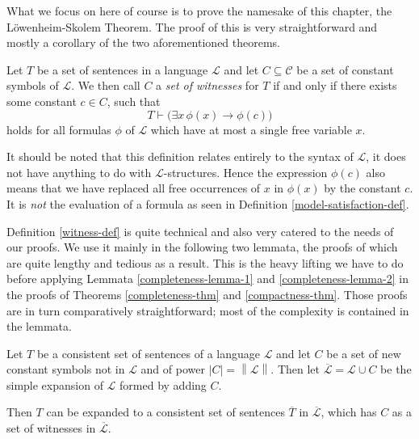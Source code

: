 \documentclass[../../main.tex]{subfiles}
\begin{document}
What we focus on here of course is to prove the namesake of this chapter, the Löwenheim-Skolem Theorem.
The proof of this is very straightforward and mostly a corollary of the two aforementioned theorems.

\begin{definition}\label{witness-def}\cite[p.61]{Cha90}
    Let $T$ be a set of sentences in a language $\mathcal{L}$ and let $C \subseteq \mathcal{C}$ be a set of constant symbols of $\mathcal{L}$.
    We then call $C$ a \emph{set of witnesses} for $T$ if and only if there exists some constant $c \in C$, such that
    $$T \vdash \big(\exists x \, \phi(x) \rightarrow \phi(c)\big)$$
    holds for all formulas $\phi$ of $\mathcal{L}$ which have at most a single free variable $x$.
\end{definition}

It should be noted that this definition relates entirely to the syntax of $\mathcal{L}$, it does not have anything to do with $\mathcal{L}$-structures.
Hence the expression $\phi(c)$ also means that we have replaced all free occurrences of $x$ in $\phi(x)$ by the constant $c$.
It is \emph{not} the evaluation of a formula as seen in Definition \ref{model-satisfaction-def}.

Definition \ref{witness-def} is quite technical and also very catered to the needs of our proofs.
We use it mainly in the following two lemmata, the proofs of which are quite lengthy and tedious as a result.
This is the heavy lifting we have to do before applying Lemmata \ref{completeness-lemma-1} and \ref{completeness-lemma-2} in the proofs of Theorems \ref{completeness-thm} and \ref{compactness-thm}.
Those proofs are in turn comparatively straightforward; most of the complexity is contained in the lemmata.

\begin{lemma}\label{completeness-lemma-1}\cite[Lemma 2.1.1]{Cha90}
    Let $T$ be a consistent set of sentences of a language $\mathcal{L}$ and   
    let $C$ be a set of new constant symbols not in $\mathcal{L}$ and of power $\left\lvert C \right\rvert = \left\lVert \mathcal{L} \right\rVert$.
    Then let $\overline{\mathcal{L}} = \mathcal{L} \cup C$ be the simple expansion of $\mathcal{L}$ formed by adding $C$.
    
    Then $T$ can be expanded to a consistent set of sentences $\overline{T}$ in $\overline{\mathcal{L}}$, which has $C$ as a set of witnesses in $\overline{\mathcal{L}}$.
\end{lemma}
\end{document}
